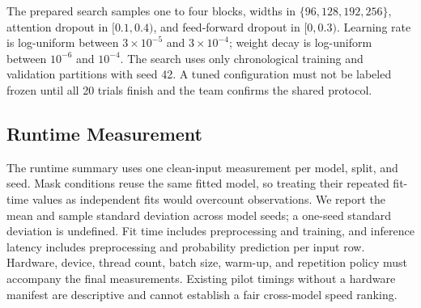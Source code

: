 The prepared search samples one to four blocks, widths in
$\{96,128,192,256\}$, attention dropout in $[0.1,0.4)$, and feed-forward dropout in
$[0,0.3)$. Learning rate is log-uniform between $3\times10^{-5}$ and
$3\times10^{-4}$; weight decay is log-uniform between $10^{-6}$ and $10^{-4}$.
The search uses only chronological training and validation partitions with seed
42. A tuned configuration must not be labeled frozen until all 20 trials finish
and the team confirms the shared protocol.

\subsection{Runtime Measurement}
The runtime summary uses one clean-input measurement per model, split, and seed.
Mask conditions reuse the same fitted model, so treating their repeated fit-time
values as independent fits would overcount observations. We report the mean and
sample standard deviation across model seeds; a one-seed standard deviation is
undefined. Fit time includes preprocessing and training, and inference latency
includes preprocessing and probability prediction per input row. Hardware, device,
thread count, batch size, warm-up, and repetition policy must accompany the final
measurements. Existing pilot timings without a hardware manifest are descriptive
and cannot establish a fair cross-model speed ranking.
